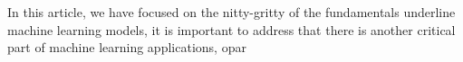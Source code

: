 In this article, we have focused on the nitty-gritty of the fundamentals underline machine learning models, it is important to address that there is another critical part of machine learning applications, opar